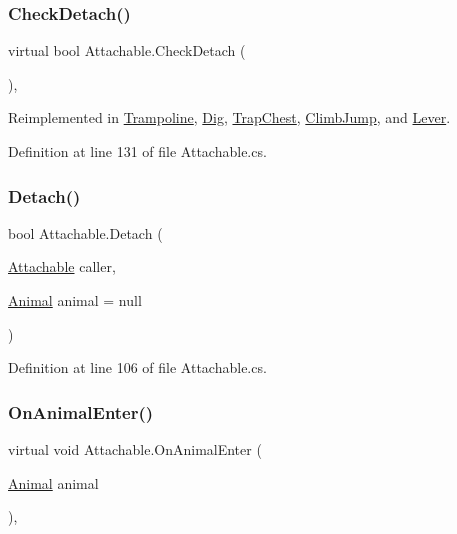 \subsubsection{\texorpdfstring{Check\+Detach()}{CheckDetach()}}
{\footnotesize\ttfamily virtual bool Attachable.\+Check\+Detach (\begin{DoxyParamCaption}{ }\end{DoxyParamCaption})\hspace{0.3cm}{\ttfamily [protected]}, {\ttfamily [virtual]}}



Reimplemented in \mbox{\hyperlink{class_trampoline_a88fb0d537bb19917501307544d3e50b5}{Trampoline}}, \mbox{\hyperlink{class_dig_abec7f4de75d9d61991eca406c402fb51}{Dig}}, \mbox{\hyperlink{class_trap_chest_ab8f0424386ce3ac8f7e0a08bd503c4f5}{Trap\+Chest}}, \mbox{\hyperlink{class_climb_jump_a16ddafaf15a3e7effb11ee3f433721f1}{Climb\+Jump}}, and \mbox{\hyperlink{class_lever_a564e83f71f387279a5e6ef4c1617e990}{Lever}}.



Definition at line 131 of file Attachable.\+cs.

\mbox{\label{class_attachable_a85cfa28ce6929e32b158c067b0421e7d}} 
\subsubsection{\texorpdfstring{Detach()}{Detach()}}
{\footnotesize\ttfamily bool Attachable.\+Detach (\begin{DoxyParamCaption}\item[{\mbox{\hyperlink{class_attachable}{Attachable}}}]{caller,  }\item[{\mbox{\hyperlink{class_animal}{Animal}}}]{animal = {\ttfamily null} }\end{DoxyParamCaption})}



Definition at line 106 of file Attachable.\+cs.

\mbox{\label{class_attachable_a068e297fb6be04b5162db5ce61290020}} 
\subsubsection{\texorpdfstring{On\+Animal\+Enter()}{OnAnimalEnter()}}
{\footnotesize\ttfamily virtual void Attachable.\+On\+Animal\+Enter (\begin{DoxyParamCaption}\item[{\mbox{\hyperlink{class_animal}{Animal}}}]{animal }\end{DoxyParamCaption})\hspace{0.3cm}{\ttfamily [protected]}, {\ttfamily [virtual]}}



